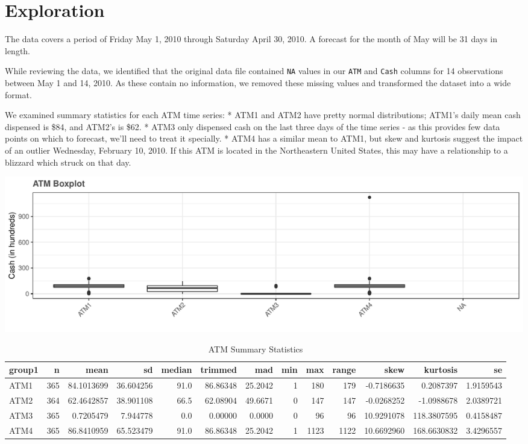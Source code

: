 \documentclass[openany]{book}
\begin{document}
\hypertarget{exploration}{%
\section{Exploration}\label{exploration}}

The data covers a period of Friday May 1, 2010 through Saturday April
30, 2010. A forecast for the month of May will be 31 days in length.

While reviewing the data, we identified that the original data file
contained \texttt{NA} values in our \texttt{ATM} and \texttt{Cash}
columns for 14 observations between May 1 and 14, 2010. As these contain
no information, we removed these missing values and transformed the
dataset into a wide format.

We examined summary statistics for each ATM time series: * ATM1 and ATM2
have pretty normal distributions; ATM1's daily mean cash dispensed is
\$84, and ATM2's is \$62. * ATM3 only dispensed cash on the last three
days of the time series - as this provides few data points on which to
forecast, we'll need to treat it specially. * ATM4 has a similar mean to
ATM1, but skew and kurtosis suggest the impact of an outlier Wednesday,
February 10, 2010. If this ATM is located in the Northeastern United
States, this may have a relationship to a blizzard which struck on that
day.

\includegraphics{Part-A-JM_JO_files/figure-latex/unnamed-chunk-2-1.pdf}

\begin{table}[t]

\caption{\label{tab:unnamed-chunk-2}ATM Summary Statistics}
\centering
\begin{tabular}{l|r|r|r|r|r|r|r|r|r|r|r|r}
\hline
group1 & n & mean & sd & median & trimmed & mad & min & max & range & skew & kurtosis & se\\
\hline
\rowcolor{gray!6}  ATM1 & 365 & 84.1013699 & 36.604256 & 91.0 & 86.86348 & 25.2042 & 1 & 180 & 179 & -0.7186635 & 0.2087397 & 1.9159543\\
\hline
ATM2 & 364 & 62.4642857 & 38.901108 & 66.5 & 62.08904 & 49.6671 & 0 & 147 & 147 & -0.0268252 & -1.0988678 & 2.0389721\\
\hline
\rowcolor{gray!6}  ATM3 & 365 & 0.7205479 & 7.944778 & 0.0 & 0.00000 & 0.0000 & 0 & 96 & 96 & 10.9291078 & 118.3807595 & 0.4158487\\
\hline
ATM4 & 365 & 86.8410959 & 65.523479 & 91.0 & 86.86348 & 25.2042 & 1 & 1123 & 1122 & 10.6692960 & 168.6630832 & 3.4296557\\
\hline
\end{tabular}
\end{table}
\end{document}
